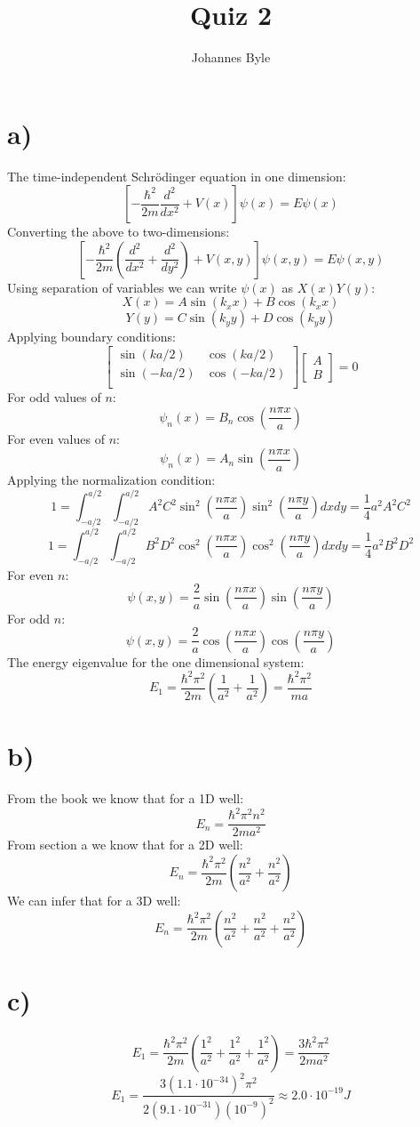 \documentclass[english]{article}
\begin{document}
\author{Johannes Byle}
\title{Quiz 2}
\maketitle
\section*{a)}
The time-independent Schr\"{o}dinger equation in one dimension:
$$\left[-\frac{\hbar^2}{2m}\frac{d^2}{dx^2}+V(x)\right]\psi(x)=E\psi(x)$$
Converting the above to two-dimensions:
$$\left[-\frac{\hbar^2}{2m}\left(\frac{d^2}{dx^2}+\frac{d^2}{dy^2}\right)+V(x,y)\right]\psi(x,y)=E\psi(x,y)$$
Using separation of variables we can write $\psi(x)$ as $X(x)Y(y)$:
$$X(x)=A\sin(k_xx)+B\cos(k_xx)$$
$$Y(y)=C\sin(k_yy)+D\cos(k_yy)$$
Applying boundary conditions:
\[
\begin{bmatrix}
\sin(ka/2) & \cos(ka/2)\\
\sin(-ka/2) & \cos(-ka/2)\\
\end{bmatrix}
\begin{bmatrix}
A\\
B
\end{bmatrix}
=0
\]
For odd values of $n$:
$$\psi_n(x)=B_n\cos\left(\frac{n\pi x}{a}\right)$$
For even values of $n$:
$$\psi_n(x)=A_n\sin\left(\frac{n\pi x}{a}\right)$$
Applying the normalization condition:
$$1=\int_{-a/2}^{a/2}\int_{-a/2}^{a/2}A^2C^2\sin^2\left(\frac{n\pi x}{a}\right)\sin^2\left(\frac{n\pi y}{a}\right)dxdy=\frac{1}{4}a^2A^2C^2$$
$$1=\int_{-a/2}^{a/2}\int_{-a/2}^{a/2}B^2D^2\cos^2\left(\frac{n\pi x}{a}\right)\cos^2\left(\frac{n\pi y}{a}\right)dxdy=\frac{1}{4}a^2B^2D^2$$
For even $n$:
$$\psi(x,y)=\frac{2}{a}\sin\left(\frac{n\pi x}{a}\right)\sin\left(\frac{n\pi y}{a}\right)$$
For odd $n$:
$$\psi(x,y)=\frac{2}{a}\cos\left(\frac{n\pi x}{a}\right)\cos\left(\frac{n\pi y}{a}\right)$$
The energy eigenvalue for the one dimensional system:
$$E_1=\frac{\hbar^2\pi^2}{2m}\left(\frac{1}{a^2}+\frac{1}{a^2}\right)=\frac{\hbar^2\pi^2}{ma}$$
\section*{b)}
From the book we know that for a 1D well:
$$E_n=\frac{\hbar^2\pi^2 n^2}{2ma^2}$$
From section a we know that for a 2D well:
$$E_n=\frac{\hbar^2\pi^2}{2m}\left(\frac{n^2}{a^2}+\frac{n^2}{a^2}\right)$$
We can infer that for a 3D well:
$$E_n=\frac{\hbar^2\pi^2}{2m}\left(\frac{n^2}{a^2}+\frac{n^2}{a^2}+\frac{n^2}{a^2}\right)$$
\section*{c)}
$$E_1=\frac{\hbar^2\pi^2}{2m}\left(\frac{1^2}{a^2}+\frac{1^2}{a^2}+\frac{1^2}{a^2}\right)=\frac{3\hbar^2\pi^2}{2ma^2}$$
$$E_1=\frac{3(1.1\cdot10^{-34})^2\pi^2}{2(9.1\cdot10^{-31})(10^{-9})^2}\approx 2.0\cdot10^{-19} J$$
\end{document}
